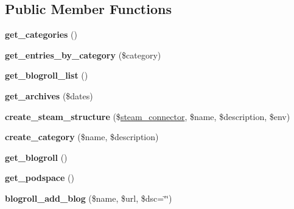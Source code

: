 \subsection*{Public Member Functions}
\begin{DoxyCompactItemize}
\item 
\hypertarget{classsteam__weblog_aa25b64d73231b2c75d2095b78afc5045}{
{\bfseries get\_\-categories} ()}
\label{classsteam__weblog_aa25b64d73231b2c75d2095b78afc5045}

\item 
\hypertarget{classsteam__weblog_a748ed17678dde64e96aa4a625e85d535}{
{\bfseries get\_\-entries\_\-by\_\-category} (\$category)}
\label{classsteam__weblog_a748ed17678dde64e96aa4a625e85d535}

\item 
\hypertarget{classsteam__weblog_a3ef599b548ef1643c80547f41331a631}{
{\bfseries get\_\-blogroll\_\-list} ()}
\label{classsteam__weblog_a3ef599b548ef1643c80547f41331a631}

\item 
\hypertarget{classsteam__weblog_aff422b91898f4048385ada2ef2e55d8b}{
{\bfseries get\_\-archives} (\$dates)}
\label{classsteam__weblog_aff422b91898f4048385ada2ef2e55d8b}

\item 
\hypertarget{classsteam__weblog_a2effdbbf42ff403488c711d1ec39925f}{
{\bfseries create\_\-steam\_\-structure} (\$\hyperlink{classsteam__connector}{steam\_\-connector}, \$name, \$description, \$env)}
\label{classsteam__weblog_a2effdbbf42ff403488c711d1ec39925f}

\item 
\hypertarget{classsteam__weblog_a488c28955ceb2713b636d18e55d588ce}{
{\bfseries create\_\-category} (\$name, \$description)}
\label{classsteam__weblog_a488c28955ceb2713b636d18e55d588ce}

\item 
\hypertarget{classsteam__weblog_aaff6cc7404fb2f46a798a394611fe4ed}{
{\bfseries get\_\-blogroll} ()}
\label{classsteam__weblog_aaff6cc7404fb2f46a798a394611fe4ed}

\item 
\hypertarget{classsteam__weblog_afb5fc48874715da0b4fd0e600ec4c0a4}{
{\bfseries get\_\-podspace} ()}
\label{classsteam__weblog_afb5fc48874715da0b4fd0e600ec4c0a4}

\item 
\hypertarget{classsteam__weblog_a70491b5ba376083688debf19f503cccf}{
{\bfseries blogroll\_\-add\_\-blog} (\$name, \$url, \$dsc=\char`\"{}\char`\"{})}
\label{classsteam__weblog_a70491b5ba376083688debf19f503cccf}


\end{DoxyCompactItemize}
